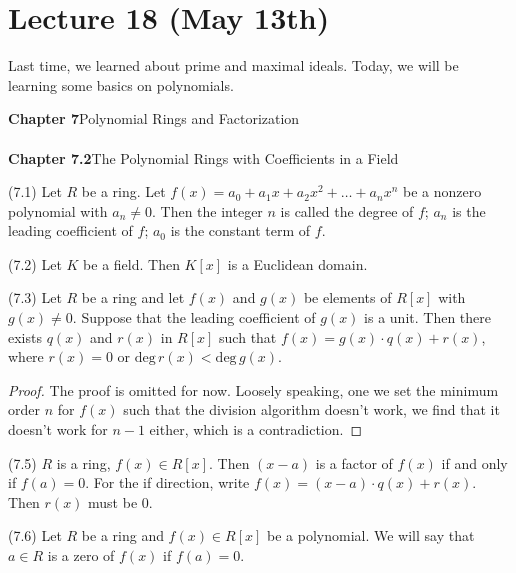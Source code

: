 \section{Lecture 18 (May 13th)}
\begin{rmk}
Last time, we learned about prime and maximal ideals. Today, we will be learning some basics on polynomials.
\end{rmk}
\vspace{2ex}
{\bf Chapter 7}\hspace{2ex}Polynomial Rings and Factorization
\\\\
{\bf Chapter 7.2}\hspace{2ex}The Polynomial Rings with Coefficients in a Field
\\
\begin{defi}
(7.1) Let $R$ be a ring. Let $f(x)=a_0+a_1x+a_2x^2+\ldots +a_{n}x^{n}$ be a nonzero polynomial with $a_{n}\ne 0$. Then the integer $n$ is called the degree of $f$; $a_{n}$ is the leading coefficient of $f$; $a_0$ is the constant term of $f$.  
\end{defi}
\vspace{2ex}
\begin{thm}
(7.2) Let $K$ be a field. Then $K[x]$ is a Euclidean domain. 
\end{thm}
\vspace{2ex}
\begin{prop}
(7.3) Let $R$ be a ring and let $f(x)$ and $g(x)$ be elements of $R[x]$	with $g(x)\ne 0$. Suppose that the leading coefficient of $g(x)$ is a unit. Then there exists $q(x)$ and $r(x)$ in $R[x]$ such that $f(x)=g(x)\cdot q(x)+r(x)$, where $r(x)=0$ or $\mathrm{deg}\,r(x)<\mathrm{deg}\,g(x)$.
\end{prop}
\vspace{2ex}
\begin{proof}
The proof is omitted for now. Loosely speaking, one we set the minimum order $n$ for $f(x)$ such that the division algorithm doesn't work, we find that it doesn't work for $n-1$ either, which is a contradiction.
\end{proof}
\vspace{2ex}
\begin{ex}
(7.5) $R$ is a ring, $f(x)\in R[x]$. Then $(x-a)$ is a factor of $f(x)$ if and only if $f(a)=0$. For the if direction, write $f(x)=(x-a)\cdot q(x)+r(x)$. Then $r(x)$ must be $0$. 
\end{ex}
\vspace{2ex}
\begin{defi}
(7.6) Let $R$ be a ring and $f(x)\in R[x]$ be a polynomial. We will say that $a\in R$ is a zero of $f(x)$ if $f(a)=0$.
\end{defi}
